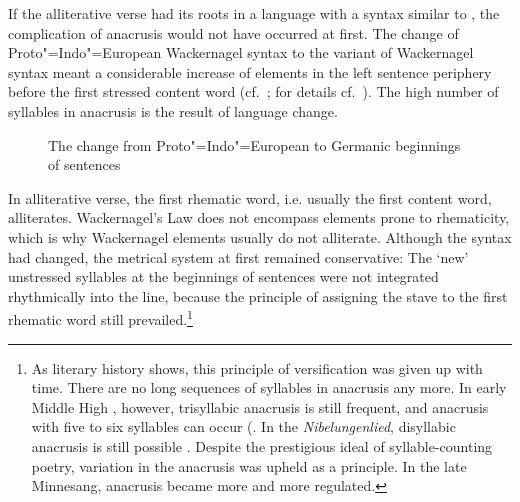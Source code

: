 \documentclass[output=paper
  ,nobabel
  ,uniformtopskip %
]{langscibook}
\begin{document}
\largerpage[2]
If the  alliterative verse had its roots in a language with a syntax similar to , the complication of  anacrusis would not have occurred at first. The change of Proto"=Indo"=European Wackernagel syntax to the  variant of Wackernagel syntax meant a considerable increase of elements in the left sentence periphery before the first stressed content word (cf.\ ; for details cf.\ \citealt{NoelAzizHanna2015}). The high number of syllables in  anacrusis is the result of language change.

\begin{figure}
\caption{The change from Proto"=Indo"=European to Germanic beginnings of sentences} \label{figure1}
\end{figure}

In alliterative verse, the first rhematic word, i.e. usually the first content word, alliterates. Wackernagel's Law does not encompass elements prone to rhematicity, which is why Wackernagel elements usually do not alliterate. Although the syntax had changed, the metrical system at first remained conservative: The `new' unstressed syllables at the beginnings of sentences were not integrated rhythmically into the line, because the principle of assigning the stave to the first rhematic word still prevailed.\footnote{As literary history shows, this principle of versification was given up with time. There are no long sequences of syllables in anacrusis any more. In early Middle High , however, trisyllabic anacrusis is still frequent, and anacrusis with five to six syllables can occur (\citet[§53]{PaulGlier1961}. In the \textit{Nibelungenlied}, disyllabic anacrusis is still possible \citep[37]{Reichert2005}. Despite the prestigious  ideal of syllable-counting poetry, variation in the anacrusis was upheld as a principle. In the late Minnesang, anacrusis became more and more regulated.} 
\end{document}
